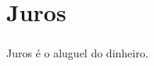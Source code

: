 \section{Juros} \label{FormProb}

\begin{frame}[c]\frametitle{}

    Juros é o aluguel do dinheiro.

\end{frame}